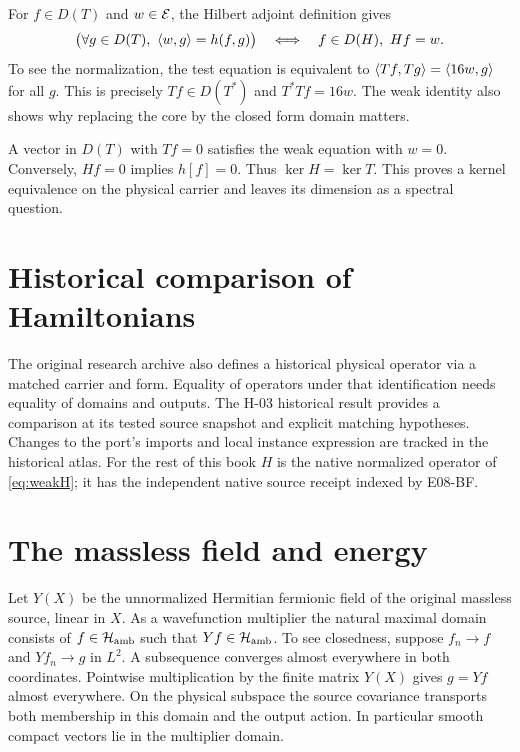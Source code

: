 For $f\in D(T)$ and $w\in\mathcal E$, the Hilbert adjoint definition gives
\begin{equation}
 \bigl(\forall g\in D(T),\ \ip{w}{g}=h(f,g)\bigr)
 \quad\Longleftrightarrow\quad f\in D(H),\ Hf=w.
 \label{eq:weakH}
\end{equation}
To see the normalization, the test equation is equivalent to
$\langle Tf,Tg\rangle=\langle 16w,g\rangle$ for all $g$. This is precisely $Tf\in D(T^\ast)$ and $T^\ast Tf=16w$. The weak identity also shows why replacing the core by the closed form domain matters.

A vector in $D(T)$ with $Tf=0$ satisfies the weak equation with $w=0$. Conversely, $Hf=0$ implies $h[f]=0$. Thus $\ker H=\ker T$. This proves a kernel equivalence on the physical carrier and leaves its dimension as a spectral question.

\section{Historical comparison of Hamiltonians}
The original research archive also defines a historical physical operator via a matched carrier and form. Equality of operators under that identification needs equality of domains and outputs. The H-03 historical result provides a comparison at its tested source snapshot and explicit matching hypotheses. Changes to the port's imports and local instance expression are tracked in the historical atlas. For the rest of this book $H$ is the native normalized operator of \eqref{eq:weakH}; it has the independent native source receipt indexed by E08-BF.

\section{The massless field and energy}
Let $Y(X)$ be the unnormalized Hermitian fermionic field of the original massless source, linear in $X$. As a wavefunction multiplier the natural maximal domain consists of $f\in\mathcal H_{\mathrm{amb}}$ such that $Yf\in\mathcal H_{\mathrm{amb}}$. To see closedness, suppose $f_n\to f$ and $Yf_n\to g$ in $L^2$. A subsequence converges almost everywhere in both coordinates. Pointwise multiplication by the finite matrix $Y(X)$ gives $g=Yf$ almost everywhere. On the physical subspace the source covariance transports both membership in this domain and the output action. In particular smooth compact vectors lie in the multiplier domain.

